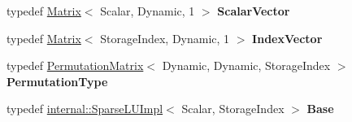 \begin{DoxyCompactItemize}
\item 
\mbox{\label{class_eigen_1_1_sparse_l_u_ac67621b3c8526fc5606a7a708427a959}} 
typedef \mbox{\hyperlink{class_eigen_1_1_matrix}{Matrix}}$<$ Scalar, Dynamic, 1 $>$ {\bfseries Scalar\+Vector}
\item 
\mbox{\label{class_eigen_1_1_sparse_l_u_a2564483882d758a16067085798d3e8ad}} 
typedef \mbox{\hyperlink{class_eigen_1_1_matrix}{Matrix}}$<$ Storage\+Index, Dynamic, 1 $>$ {\bfseries Index\+Vector}
\item 
\mbox{\label{class_eigen_1_1_sparse_l_u_a56c15a8364c3dea625d1f1404e7b07d1}} 
typedef \mbox{\hyperlink{class_eigen_1_1_permutation_matrix}{Permutation\+Matrix}}$<$ Dynamic, Dynamic, Storage\+Index $>$ {\bfseries Permutation\+Type}
\item 
\mbox{\label{class_eigen_1_1_sparse_l_u_ae4f85e309c65f3f93cbc96a43c39336d}} 
typedef \mbox{\hyperlink{class_eigen_1_1internal_1_1_sparse_l_u_impl}{internal\+::\+Sparse\+L\+U\+Impl}}$<$ Scalar, Storage\+Index $>$ {\bfseries Base}
\end{DoxyCompactItemize}
